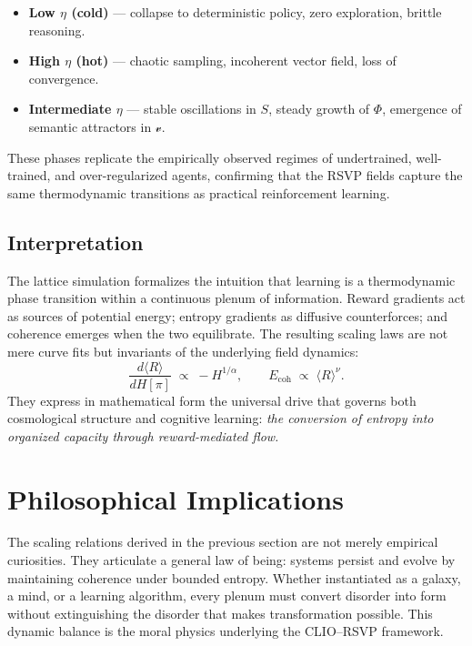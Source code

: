 \documentclass[11pt]{article}
\begin{document}
\begin{itemize}
  \item \textbf{Low $\eta$ (cold)} — collapse to deterministic policy, zero exploration, brittle reasoning.
  \item \textbf{High $\eta$ (hot)} — chaotic sampling, incoherent vector field, loss of convergence.
  \item \textbf{Intermediate $\eta$} — stable oscillations in $S$, steady growth of $\Phi$, emergence of semantic attractors in $\mathcal{v}$.
\end{itemize}

These phases replicate the empirically observed regimes of undertrained, well-trained, and over-regularized agents, confirming that the RSVP fields capture the same thermodynamic transitions as practical reinforcement learning.

\subsection{Interpretation}

The lattice simulation formalizes the intuition that learning is a thermodynamic phase transition within a continuous plenum of information.  
Reward gradients act as sources of potential energy;  
entropy gradients as diffusive counterforces;  
and coherence emerges when the two equilibrate.  
The resulting scaling laws are not mere curve fits but invariants of the underlying field dynamics:
\[
\boxed{
\frac{d\langle R\rangle}{dH[\pi]} \;\propto\; -H^{1/\alpha},
\qquad
E_{\mathrm{coh}} \;\propto\; \langle R\rangle^{\nu}.
}
\]
They express in mathematical form the universal drive that governs both cosmological structure and cognitive learning:  
\emph{the conversion of entropy into organized capacity through reward-mediated flow.}

\section{Philosophical Implications}
The scaling relations derived in the previous section are not merely empirical curiosities.  
They articulate a general law of being: systems persist and evolve by maintaining coherence under bounded entropy.  
Whether instantiated as a galaxy, a mind, or a learning algorithm, every plenum must convert disorder into form without extinguishing the disorder that makes transformation possible.  
This dynamic balance is the moral physics underlying the CLIO–RSVP framework.
\end{document}
